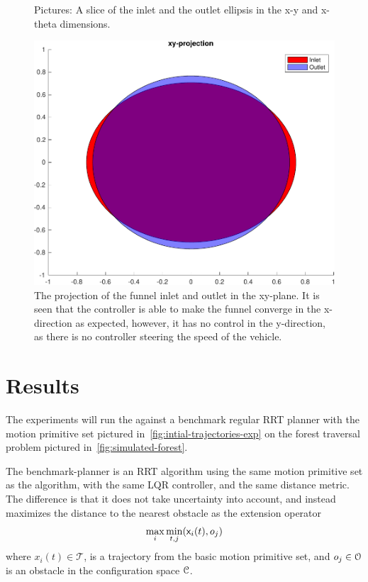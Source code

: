 \begin{figure}
\begin{subfigure}[b]{0.4\textwidth}
  \end{subfigure}
  \caption{Pictures: A slice of the inlet and the outlet ellipsis in the x-y and
    x-theta dimensions.}
  \label{fig:funnel-conv}
\end{figure}

\begin{figure}
\centering
\includegraphics[width=\textwidth]{figures/experiments/funnel-inlet-outlet}
\caption{The projection of the funnel inlet and outlet in the xy-plane. It is
  seen that the controller is able to make the funnel converge in the
  x-direction as expected, however, it has no control in the y-direction, as
  there is no controller steering the speed of the vehicle.}
\label{fig:funnel-inlet-outlet}
\end{figure}

\section{Results}
\label{sec:experiments-final}

The experiments will run the \rrtfunnel{} against a benchmark regular RRT
planner with the motion primitive set pictured
in~\cref{fig:intial-trajectories-exp} on the forest traversal problem pictured
in~\cref{fig:simulated-forest}.

The benchmark-planner is an \ac{RRT} algorithm using the same motion primitive
set as the \rrtfunnel{} algorithm, with the same \ac{LQR} controller, and the
same distance metric. The difference is that it does not take uncertainty into
account, and instead maximizes the distance to the nearest obstacle as the
extension operator \ie{}
\begin{equation}
  \max_{i}\min_{t,j}({\mathbf{\mathsf{x}}}_{i}(t), o_{j})
\end{equation}
where \(x_{i}(t) \in \mathcal{T}\), is a trajectory from the basic motion
primitive set, and \(o_{j} \in \mathcal{O}{}\) is an obstacle in the
configuration space \(\mathcal{C}{}\).

